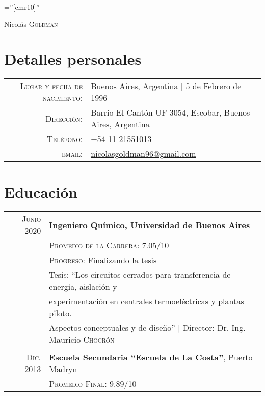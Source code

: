 \documentclass[a4paper,10pt]{article}
\begin{document}

\pagestyle{empty} %

\font\fb=''[cmr10]'' %

\par{\centering
		{\Huge Nicolás \textsc{Goldman}
	}\bigskip\par}

\section{Detalles personales}\smallskip

\begin{tabular}{rl}
    \textsc{Lugar y fecha de nacimiento:} & Buenos Aires, Argentina  | 5 de Febrero de 1996 \\
    \textsc{Dirección:}   & Barrio El Cantón UF 3054, Escobar, Buenos Aires, Argentina \\
    \textsc{Teléfono:}     & +54 11 21551013\\
    \textsc{email:}     & \href{mailto:nicolasgoldman96@gmail.com}{\underline{nicolasgoldman96@gmail.com}}
\smallskip\end{tabular}

\section{Educación}\smallskip
\begin{tabular}{rl}	
\textsc{Junio} 2020 & \textbf{Ingeniero Químico,  Universidad de Buenos Aires}\\
&\small\textsc{Promedio de la Carrera:} 7.05/10\\
&\small\textsc{Progreso:} Finalizando la tesis  \\
& Tesis: ``Los circuitos cerrados para transferencia de energía, aislación y\\& experimentación en centrales termoeléctricas y plantas piloto.\\& Aspectos conceptuales y de diseño'' | \small Director: Dr. Ing. Mauricio \textsc{Chocrón}\\\\
\textsc{Dic.} 2013& \textbf{Escuela Secundaria ``Escuela de La Costa''}, Puerto Madryn\\ &\small\textsc{Promedio Final:} 9.89/10
\end{tabular}\smallskip
\end{document}
